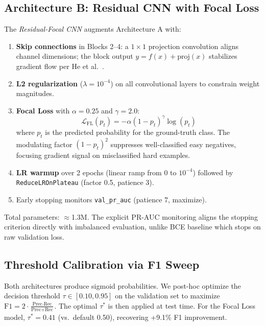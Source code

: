 \documentclass[10pt,twocolumn]{article}
\begin{document}
\subsection{Architecture B: Residual CNN with Focal Loss}

The \emph{Residual-Focal CNN} augments Architecture A with:

\begin{enumerate}[leftmargin=1.3em, itemsep=0pt]
  \item \textbf{Skip connections} in Blocks 2--4: a $1{\times}1$ projection
  convolution aligns channel dimensions; the block output $y = f(x) + \text{proj}(x)$
  stabilizes gradient flow per He et al.~\cite{he2016resnet}.
  \item \textbf{L2 regularization} ($\lambda{=}10^{-4}$) on all convolutional layers
  to constrain weight magnitudes.
  \item \textbf{Focal Loss} with $\alpha{=}0.25$ and $\gamma{=}2.0$:
    \begin{equation}
      \mathcal{L}_{\text{FL}}(p_t) = -\alpha (1-p_t)^\gamma \log(p_t)
      \label{eq:focal}
    \end{equation}
  where $p_t$ is the predicted probability for the ground-truth class.
  The modulating factor $(1-p_t)^2$ suppresses well-classified easy negatives,
  focusing gradient signal on misclassified hard examples.
  \item \textbf{LR warmup} over 2 epochs (linear ramp from $0$ to $10^{-4}$)
  followed by \texttt{ReduceLROnPlateau} (factor 0.5, patience 3).
  \item Early stopping monitors \texttt{val\_pr\_auc} (patience 7, maximize).
\end{enumerate}

Total parameters: $\approx$1.3M. The explicit PR-AUC monitoring aligns the
stopping criterion directly with imbalanced evaluation, unlike BCE baseline
which stops on raw validation loss.

\subsection{Threshold Calibration via F1 Sweep}

Both architectures produce sigmoid probabilities. We post-hoc optimize the
decision threshold $\tau \in [0.10, 0.95]$ on the validation set to maximize
$\text{F1} = 2 \cdot \frac{\text{Prec} \cdot \text{Rec}}{\text{Prec} + \text{Rec}}$.
The optimal $\tau^*$ is then applied at test time. For the Focal Loss model,
$\tau^*{=}0.41$ (vs.\ default 0.50), recovering +9.1\% F1 improvement.
\end{document}
